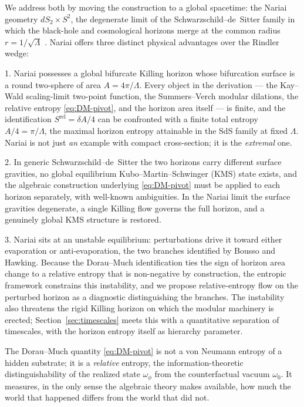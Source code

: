 \documentclass[11pt]{article}
\newcommand{\Srel}{S^{\mathrm{rel}}}
\newcommand{\Nariai}{Nariai}
\begin{document}
We address both by moving the construction to a global spacetime: the \Nariai{} geometry $dS_2 \times S^2$, the degenerate limit of the Schwarzschild--de~Sitter family in which the black-hole and cosmological horizons merge at the common radius $r = 1/\sqrt{\Lambda}$ \cite{Nariai}. \Nariai{} offers three distinct physical advantages over the Rindler wedge:

1. \Nariai{} possesses a global bifurcate Killing horizon whose bifurcation surface is a round two-sphere of area $A = 4\pi/\Lambda$. Every object in the derivation --- the Kay--Wald scaling-limit two-point function, the Summers--Verch modular dilations, the relative entropy \eqref{eq:DM-pivot}, and the horizon area itself --- is finite, and the identification $\Srel = \delta A/4$ can be confronted with a finite total entropy $A/4 = \pi/\Lambda$, the maximal horizon entropy attainable in the SdS family at fixed $\Lambda$. \Nariai{} is not just \emph{an} example with compact cross-section; it is the \emph{extremal} one.

2. In generic Schwarzschild--de~Sitter the two horizons carry different surface gravities, no global equilibrium Kubo--Martin--Schwinger (KMS) state exists, and the algebraic construction underlying \eqref{eq:DM-pivot} must be applied to each horizon separately, with well-known ambiguities. In the \Nariai{} limit the surface gravities degenerate, a single Killing flow governs the full horizon, and a genuinely global KMS structure is restored.

3. \Nariai{} sits at an unstable equilibrium: perturbations drive it toward either evaporation or anti-evaporation, the two branches identified by Bousso and Hawking. Because the Dorau--Much identification ties the sign of horizon area change to a relative entropy that is non-negative by construction, the entropic framework constrains this instability, and we propose relative-entropy flow on the perturbed horizon as a diagnostic distinguishing the branches. The instability also threatens the rigid Killing horizon on which the modular machinery is erected; Section~\ref{sec:timescales} meets this with a quantitative separation of timescales, with the horizon entropy itself as hierarchy parameter.

The Dorau--Much quantity \eqref{eq:DM-pivot} is not a von Neumann entropy of a hidden substrate; it is a \emph{relative} entropy, the information-theoretic distinguishability of the realized state $\omega_\phi$ from the counterfactual vacuum $\omega_0$. It measures, in the only sense the algebraic theory makes available, how
much the world that happened differs from the world that did not.
\end{document}

